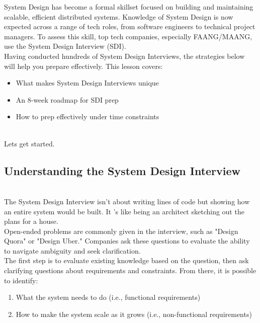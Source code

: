 

System Design has become a formal skillset focused on building and maintaining scalable, efficient distributed systems. Knowledge of System Design is now expected across a range of tech roles, from software engineers to technical project managers. To assess this skill, top tech companies, especially FAANG/MAANG, use the System Design Interview (SDI).
\\
Having conducted hundreds of System Design Interviews, the strategies below will help you prepare effectively. This lesson covers:

\begin{itemize}
\item
\protect{}\label{wKTN6XKe0u9XyD44o2wvW}
What makes System Design Interviews unique
\item
\protect{}\label{u5fR0aawZMJ5wLJvgxWaS}
An 8-week roadmap for SDI prep
\item
\protect{}\label{1iP4muntaoP34Pp-kAyZG}
How to prep effectively under time constraints
\end{itemize}
\\
Let\textquotesingle s get started.

\subsection{Understanding the System Design Interview}\label{IEEUYLuOq49AyLThJo2Yv}
\\
The System Design Interview isn't about writing lines of code but showing how an entire system would be built. It 's like being an architect sketching out the plans for a house.
\\
Open-ended problems are commonly given in the interview, such as "Design Quora" or "Design Uber." Companies ask these questions to evaluate the ability to navigate ambiguity and seek clarification.
\\
The first step is to evaluate existing knowledge based on the question, then ask clarifying questions about requirements and constraints. From there, it is possible to identify:

\begin{enumerate}
\item
\protect{}\label{uDpO8FKWP4cMIw8_yq6Zd}
What the system needs to do (i.e., functional requirements)
\item
\protect{}\label{fHAVGshcNp0CRx7WB8W6S}
How to make the system scale as it grows (i.e., non-functional requirements)
\end{enumerate}

